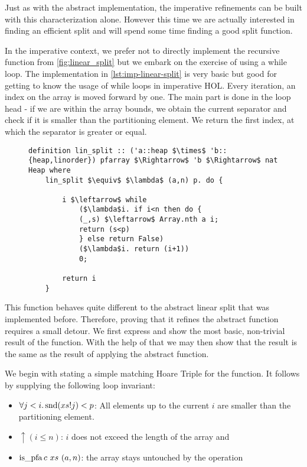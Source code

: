 Just as with the abstract implementation,
the imperative refinements can be built with this characterization alone.
However this time we are actually interested in finding an
efficient split and will spend some time finding
a good split function.

In the imperative context, we prefer not to directly
implement the recursive function from \autoref{fig:linear_split}
but we embark on the exercise of using a while loop.
The implementation in \autoref{lst:imp-linear-split}
is very basic but good for getting to know
the usage of while loops in imperative HOL.
Every iteration, an index on the array is moved forward by one.
The main part is done in the loop head - if we
are within the array bounds,
we obtain the current separator and check if it is
smaller than the partitioning element.
We return the first index, at which the separator is greater or equal.

\begin{figure}
\begin{lstlisting}[mathescape=true, language=Isabelle, caption={The imperative linear split},
    label={lst:imp-linear-split}]
definition lin_split :: ('a::heap $\times$ 'b::{heap,linorder}) pfarray $\Rightarrow$ 'b $\Rightarrow$ nat Heap where
    lin_split $\equiv$ $\lambda$ (a,n) p. do { 
   
        i $\leftarrow$ while  
            ($\lambda$i. if i<n then do { 
            (_,s) $\leftarrow$ Array.nth a i; 
            return (s<p) 
            } else return False)  
            ($\lambda$i. return (i+1))  
            0; 
                
        return i 
    }
\end{lstlisting}
\end{figure}

This function behaves quite different to the abstract linear split
that was implemented before.
Therefore, proving that it refines the abstract function requires a small detour.
We first express and show the most basic, non-trivial result of the function.
With the help of that we may then show that the result is the same as the result
of applying the abstract function.

We begin with stating a simple matching Hoare Triple
for the function.
It follows by supplying the following loop invariant:

\begin{itemize}
    \item $\forall j<i. \operatorname{snd} (xs!j) < p$: All elements up to the current $i$
        are smaller than the partitioning element.
    \item $\uparrow(i \leq n)$: $i$ does not exceed the length of the array and
    \item $\operatorname{is\_pfa} c\ xs\ (a,n)$: the array stays untouched by the operation
\end{itemize}

